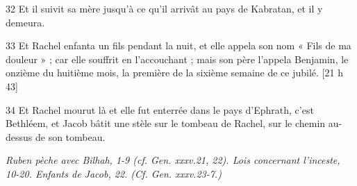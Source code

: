 \par 32 Et il suivit sa mère jusqu'à ce qu'il arrivât au pays de Kabratan, et il y demeura.
\par 33 Et Rachel enfanta un fils pendant la nuit, et elle appela son nom « Fils de ma douleur » ; car elle souffrit en l'accouchant ; mais son père l'appela Benjamin, le onzième du huitième mois, la première de la sixième semaine de ce jubilé. [21 h 43]
\par 34 Et Rachel mourut là et elle fut enterrée dans le pays d'Ephrath, c'est Bethléem, et Jacob bâtit une stèle sur le tombeau de Rachel, sur le chemin au-dessus de son tombeau.


\par \textit{Ruben pèche avec Bilhah, 1-9 (cf. Gen. xxxv.21, 22). Lois concernant l'inceste, 10-20. Enfants de Jacob, 22. (Cf. Gen. xxxv.23-7.)}

